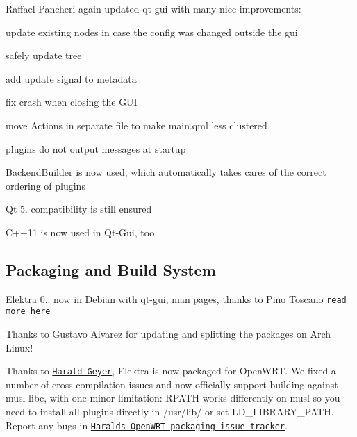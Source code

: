 Raffael Pancheri again updated qt-\/gui with many nice improvements\+:


\begin{DoxyItemize}
\item update existing nodes in case the config was changed outside the gui
\item safely update tree
\item add update signal to metadata
\item fix crash when closing the G\+UI
\item move Actions in separate file to make main.\+qml less clustered
\item plugins do not output messages at startup
\item {\ttfamily Backend\+Builder} is now used, which automatically takes cares of the correct ordering of plugins
\item Qt 5. compatibility is still ensured
\item C++11 is now used in Qt-\/\+Gui, too
\end{DoxyItemize}

\subsection*{Packaging and Build System}

Elektra 0.. now in Debian with qt-\/gui, man pages, thanks to Pino Toscano \href{https://packages.qa.debian.org/e/elektra/news/20151215T000031Z.html}{\tt read more here}

Thanks to Gustavo Alvarez for updating and splitting the packages on Arch Linux!

Thanks to \href{http://friends.ccbib.org/harald/supporting/}{\tt Harald Geyer}, Elektra is now packaged for Open\+W\+RT. We fixed a number of cross-\/compilation issues and now officially support building against musl libc, with one minor limitation\+: R\+P\+A\+TH works differently on musl so you need to install all plugins directly in /usr/lib/ or set L\+D\+\_\+\+L\+I\+B\+R\+A\+R\+Y\+\_\+\+P\+A\+TH. Report any bugs in \href{https://github.com/haraldg/packages}{\tt Harald\textquotesingle{}s Open\+W\+RT packaging issue tracker}.


